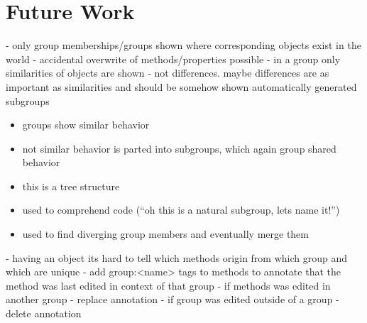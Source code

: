 \section{Future Work} \label{sec:FUTURE_WORK}

- only group memberships/groups shown where corresponding objects exist in the world
- accidental overwrite of methods/properties possible
- in a group only similarities of objects are shown - not differences. maybe differences are as important as similarities and should be somehow shown
automatically generated subgroups
 \begin{itemize}
  \item groups show similar behavior
  \item not similar behavior is parted into subgroups, which again group shared behavior
  \item this is a tree structure
  \item used to comprehend code (``oh this is a natural subgroup, lets name it!'')
  \item used to find diverging group members and eventually merge them
 \end{itemize}

 
- having an object its hard to tell which methods origin from which group and which are unique
- add group:<name> tags to methods to annotate that the method was last edited in context of that group
- if methods was edited in another group - replace annotation
- if group was edited outside of a group - delete annotation

